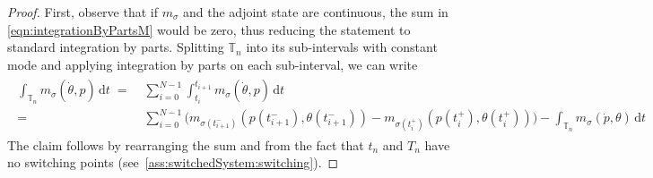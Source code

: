 \documentclass[reqno]{amsart}
\newcommand{\timeInt}{\mathbb{T}}
\newcommand{\state}{\theta}
\newcommand{\adState}{p}
\newcommand{\dt}{\,\mathrm{d}t}
\newcommand{\switch}{\sigma}
\begin{document}
\begin{proof}
   First, observe that if $m_{\switch}$ and the adjoint state are continuous, the sum in \eqref{eqn:integrationByPartsM} would be zero, thus reducing the statement to standard integration by parts. Splitting $\timeInt_n$ into its sub-intervals with constant mode and applying integration by parts on each sub-interval, we can write
    \begin{align*}
        \begin{aligned}
            \int_{\timeInt_n} m_{\switch}(\dot{\state},\adState)\dt\;=&\;\sum_{i=0}^{N-1}\int_{t_i}^{t_{i+1}} m_{\switch}(\dot{\state},\adState)\dt\\
            =&\;\sum_{i=0}^{N-1}\big( m_{\switch(t^-_{i+1})}(\adState(t^-_{i+1}),\state(t_{i+1}^-)) - m_{\switch(t^+_i)}(\adState(t^+_{i}),\state(t_{i}^+))\big)-\int_{\timeInt_n} m_{\switch}(\dot{\adState},\state)\dt
        \end{aligned}
    \end{align*}
   The claim follows by rearranging the sum and from the fact that $t_n$ and $T_n$ have no switching points (see \,\ref{ass:switchedSystem:switching}).
\end{proof}
%
\end{document}
